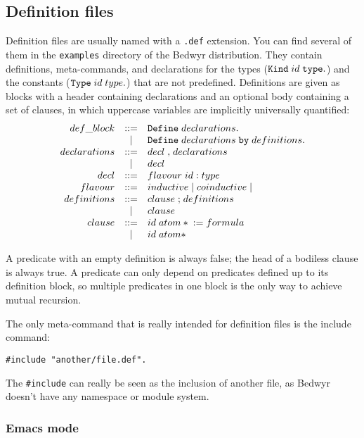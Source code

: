 \subsection{Definition files}

Definition files are usually named with a \verb|.def| extension. You can
find several of them in the \verb.examples. directory of the Bedwyr
distribution. They contain definitions, meta-commands, and declarations
for the types (${\tt Kind}\;id\;{\tt type.}$) and the constants (${\tt
Type}\;id\;type{\tt .}$) that are not predefined. Definitions are given
as blocks with a header containing declarations and an optional body
containing a set of clauses, in which uppercase variables are implicitly
universally quantified:
\[\begin{array}{rcl}
  def\_block    &::=& {\tt Define}\;declarations{\tt .} \\
                & | & {\tt Define}\;declarations\;{\tt by}\;
                     definitions{\tt.} \\
  declarations  &::=& decl\;{\tt,}\;declarations \\
                & | & decl\\
  decl          &::=& flavour\;id\;{\tt :}\;type \\
  flavour       &::=& inductive\;|\;coinductive\;|\\
  definitions   &::=& clause\;{\tt;}\;definitions \\
                & | & clause\\
  clause        &::=& id\;atom*\;{\tt:=}\;formula \\
                & | & id\;atom* \\
\end{array}\]

A predicate with an empty definition is always false;
the head of a bodiless clause is always true.
A predicate can only depend on predicates defined up to its definition
block, so multiple predicates in one block is the only way to achieve
mutual recursion.

The only meta-command that is really intended for definition files is the
include command:
\begin{verbatim}#include "another/file.def".\end{verbatim}
The \verb.#include. can really be seen as the inclusion of another file,
as Bedwyr doesn't have any namespace or module system.

\subsubsection{Emacs mode}

